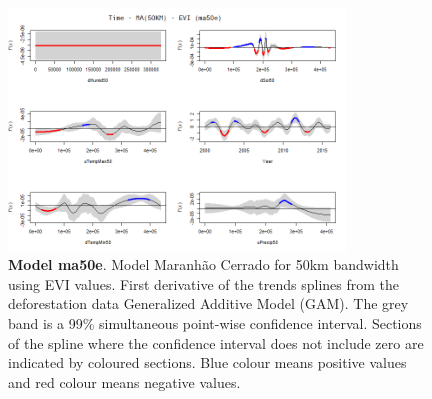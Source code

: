 \begin{table}

\begin{figure}[H]
 \centering
        \centering
        \includegraphics[width=0.8\textwidth]{ma50e.png} %
        \caption[Model Cerrado Maranhão for 50km bandwidth using EVI values. First derivative of the trends splines from the deforestation data Generalized Additive Model (GAM)]{\textbf{Model ma50e}. Model Maranhão Cerrado for 50km bandwidth using EVI values. First derivative of the trends splines from the deforestation data Generalized Additive Model (GAM). The grey band is a 99\% simultaneous point-wise confidence interval. Sections of the spline where the confidence interval does not include zero are indicated by coloured sections. Blue colour means positive values and red colour means negative values.}
\end{figure}
\end{table}

